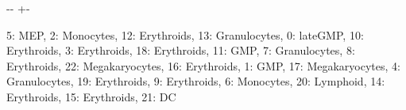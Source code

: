 \documentclass[letterpaper,10pt,english]{sphinxmanual}
\newlength\nbsphinxcodecellspacing
\begin{document}
{

\kern-\sphinxverbatimsmallskipamount\kern-\baselineskip
\kern+\FrameHeightAdjust\kern-\fboxrule
\vspace{\nbsphinxcodecellspacing}

%
\begin{sphinxVerbatim}[commandchars=\\\{\}]
\llap{\color{nbsphinxout}[22]:\,\hspace{\fboxrule}\hspace{\fboxsep}}\PYGZob{}\PYGZsq{}5\PYGZsq{}: \PYGZsq{}MEP\PYGZsq{},
 \PYGZsq{}2\PYGZsq{}: \PYGZsq{}Monocytes\PYGZsq{},
 \PYGZsq{}12\PYGZsq{}: \PYGZsq{}Erythroids\PYGZsq{},
 \PYGZsq{}13\PYGZsq{}: \PYGZsq{}Granulocytes\PYGZsq{},
 \PYGZsq{}0\PYGZsq{}: \PYGZsq{}late\PYGZus{}GMP\PYGZsq{},
 \PYGZsq{}10\PYGZsq{}: \PYGZsq{}Erythroids\PYGZsq{},
 \PYGZsq{}3\PYGZsq{}: \PYGZsq{}Erythroids\PYGZsq{},
 \PYGZsq{}18\PYGZsq{}: \PYGZsq{}Erythroids\PYGZsq{},
 \PYGZsq{}11\PYGZsq{}: \PYGZsq{}GMP\PYGZsq{},
 \PYGZsq{}7\PYGZsq{}: \PYGZsq{}Granulocytes\PYGZsq{},
 \PYGZsq{}8\PYGZsq{}: \PYGZsq{}Erythroids\PYGZsq{},
 \PYGZsq{}22\PYGZsq{}: \PYGZsq{}Megakaryocytes\PYGZsq{},
 \PYGZsq{}16\PYGZsq{}: \PYGZsq{}Erythroids\PYGZsq{},
 \PYGZsq{}1\PYGZsq{}: \PYGZsq{}GMP\PYGZsq{},
 \PYGZsq{}17\PYGZsq{}: \PYGZsq{}Megakaryocytes\PYGZsq{},
 \PYGZsq{}4\PYGZsq{}: \PYGZsq{}Granulocytes\PYGZsq{},
 \PYGZsq{}19\PYGZsq{}: \PYGZsq{}Erythroids\PYGZsq{},
 \PYGZsq{}9\PYGZsq{}: \PYGZsq{}Erythroids\PYGZsq{},
 \PYGZsq{}6\PYGZsq{}: \PYGZsq{}Monocytes\PYGZsq{},
 \PYGZsq{}20\PYGZsq{}: \PYGZsq{}Lymphoid\PYGZsq{},
 \PYGZsq{}14\PYGZsq{}: \PYGZsq{}Erythroids\PYGZsq{},
 \PYGZsq{}15\PYGZsq{}: \PYGZsq{}Erythroids\PYGZsq{},
 \PYGZsq{}21\PYGZsq{}: \PYGZsq{}DC\PYGZsq{}\PYGZcb{}
\end{sphinxVerbatim}
}

{
%
\begin{sphinxVerbatim}[commandchars=\\\{\}]
\llap{\color{nbsphinxin}[23]:\,\hspace{\fboxrule}\hspace{\fboxsep}}\PYG{p}{[}\PYG{p}{]}  \PYG{p}{[}\PYG{p}{[}\PYG{p}{]}    \PYG{p}{]}
\end{sphinxVerbatim}
}
\end{document}
